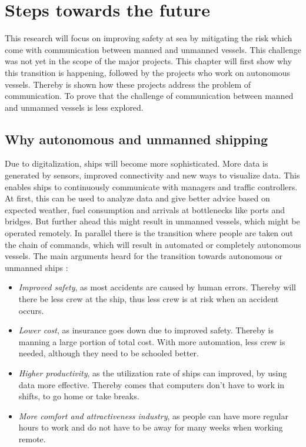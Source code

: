 \chapter{Steps towards the future}
\label{ch:future}
This research will focus on improving safety at sea by mitigating the risk which come with communication between manned and unmanned vessels. This challenge was not yet in the scope of the major projects. This chapter will first show why this transition is happening, followed by the projects who work on autonomous vessels. Thereby is shown how these projects address the problem of communication. To prove that the challenge of communication between manned and unmanned vessels is less explored.

\section{Why autonomous and unmanned shipping}
Due to digitalization, ships will become more sophisticated. More data is generated by sensors, improved connectivity and new ways to visualize data. This enables ships to continuously communicate with managers and traffic controllers. At first, this can be used to analyze data and give better advice based on expected weather, fuel consumption and arrivals at bottlenecks like ports and bridges.
But further ahead this might result in unmanned vessels, which might be operated remotely. In parallel there is the transition where people are taken out the chain of commands, which will result in automated or completely autonomous vessels. The main arguments heard for the transition towards autonomous or unmanned ships \cite{Saarni2018}:
\begin{itemize}
	\item \emph{Improved safety}, as most accidents are caused by human errors. Thereby will there be less crew at the ship, thus less crew is at risk when an accident occurs.
	\item \emph{Lower cost}, as insurance goes down due to improved safety. Thereby is manning a large portion of total cost. With more automation, less crew is needed, although they need to be schooled better.
	\item \emph{Higher productivity}, as the utilization rate of ships can improved, by using data more effective. Thereby comes that computers don't have to work in shifts, to go home or take breaks.
	\item \emph{More comfort and attractiveness industry}, as people can have more regular hours to work and do not have to be away for many weeks when working remote.
\end{itemize}
